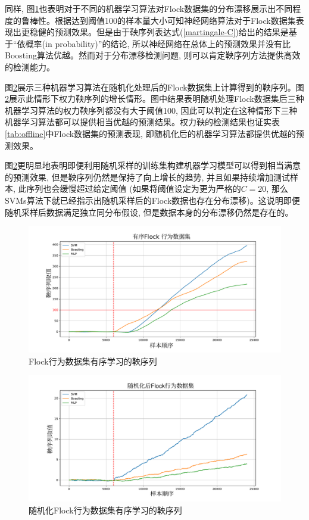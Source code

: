 同样, 图\ref{fig:flock-mar}也表明对于不同的机器学习算法对Flock数据集的分布漂移展示出不同程度的鲁棒性。根据达到阈值100的样本量大小可知神经网络算法对于Flock数据集表现出更稳健的预测效果。但是由于鞅序列表达式(\ref{martingale-C})给出的结果是基于“依概率(in probability)”的结论, 所以神经网络在总体上的预测效果并没有比Boosting算法优越。然而对于分布漂移检测问题, 则可以肯定鞅序列方法提供高效的检测能力。

图\ref{fig:radom-flock-mar}展示三种机器学习算法在随机化处理后的Flock数据集上计算得到的鞅序列。图\ref{fig:radom-flock-mar}展示此情形下权力鞅序列的增长情形。图中结果表明随机处理Flock数据集后三种机器学习算法的权力鞅序列都没有大于阈值100, 因此可以判定在这种情形下三种机器学习算法都可以提供相当优越的预测结果。权力鞅的检测结果也证实表\ref{tab:offline}中Flock数据集的预测表现, 即随机化后的机器学习算法都提供优越的预测效果。

图\ref{fig:radom-flock-mar}更明显地表明即便利用随机采样的训练集构建机器学习模型可以得到相当满意的预测效果, 但是鞅序列仍然是保持了向上增长的趋势, 并且如果持续增加测试样本, 此序列也会缓慢超过给定阈值 (如果将阈值设定为更为严格的$C=20$, 那么SVMs算法下就已经指示出随机采样后的Flock数据也存在分布漂移)。这说明即便随机采样后数据满足独立同分布假设, 但是数据本身的分布漂移仍然是存在的。

\begin{figure}[htbp] %
\centerline{
\includegraphics[width=1\linewidth]{Img/chapter9/Flock data set-icml}}
\caption{{Flock}行为数据集有序学习的鞅序列}
\label{fig:flock-mar}
\end{figure}
\begin{figure}[htbp] %
\centerline{
\includegraphics[width=1\linewidth]{Img/chapter9/Randomly shuffling Flock data sett-icml}}
\caption{随机化{Flock}行为数据集有序学习的鞅序列}
\label{fig:radom-flock-mar}
\end{figure}


